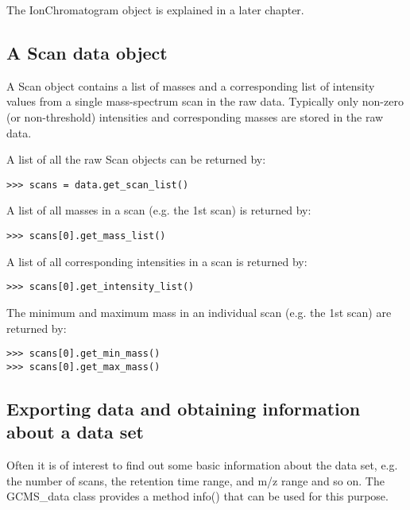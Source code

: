 \noindent
The IonChromatogram object is explained in a later chapter.

\subsection{A Scan data object}

A Scan object contains a list of masses and a corresponding list of intensity
values from a single mass-spectrum scan in the raw data. Typically only
non-zero (or non-threshold) intensities and corresponding masses are stored in
the raw data.


A list of all the raw Scan objects can be returned by:

\begin{verbatim}
>>> scans = data.get_scan_list()
\end{verbatim}

A list of all masses in a scan (e.g. the 1st scan) is returned by:

\begin{verbatim}
>>> scans[0].get_mass_list()
\end{verbatim}

A list of all corresponding intensities in a scan is returned by:

\begin{verbatim}
>>> scans[0].get_intensity_list()
\end{verbatim}

The minimum and maximum mass in an individual scan (e.g. the 1st scan) are
returned by:

\begin{verbatim}
>>> scans[0].get_min_mass()
>>> scans[0].get_max_mass()
\end{verbatim}

\subsection{Exporting data and obtaining information about a data set}


Often it is of interest to find out some basic information about the
data set, e.g. the number of scans, the retention time range, and
m/z range and so on. The GCMS\_data class provides a method info()
that can be used for this purpose.

